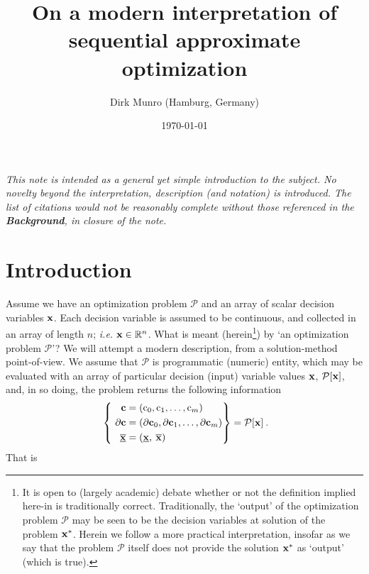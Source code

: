 \documentclass[11pt]{article}
\title{On a modern interpretation of sequential approximate optimization}
\author{Dirk Munro (Hamburg, Germany)}
\date{\today }
\begin{document}
\maketitle
\vspace{-5mm}
\emph{This note is intended as a general yet simple introduction to the subject. No novelty beyond the interpretation, description (and notation) is introduced. The list of citations would not be reasonably complete without those referenced in the \textbf{Background}, in closure of the note.}

\section{Introduction}

Assume we have an optimization problem $\mathcal{P}$ and an array of scalar decision variables $\mathbf{x}$. Each decision variable is assumed to be continuous, and collected in an array of length $n$; \emph{i.e.} $\mathbf{x} \in \mathbb{R}^n$. What is meant (herein\footnote{It is open to (largely academic) debate whether or not the definition implied here-in is traditionally correct. Traditionally, the `output' of the optimization problem $\mathcal{P}$ may be seen to be the decision variables at solution of the problem $\mathbf{x}^\ast$. Herein we follow a more practical interpretation, insofar as we say that the problem $\mathcal{P}$ itself does not provide the solution $\mathbf{x}^\ast$ as `output' (which is true).}) by `an optimization problem $\mathcal{P}$'? We will attempt a modern description, from a solution-method point-of-view. We assume that $\mathcal{P}$ is programmatic (numeric) entity, which may be evaluated with an array of particular decision (input) variable values $\mathbf{x}$, $\mathcal{P}[\mathbf{x}]$, and, in so doing, the problem returns the following information
\begin{align}
\label{d:eqn:p}
 ~\left\{ ~
\begin{aligned}
\mathbf{c} &= (\textrm{c}_0, \textrm{c}_1, \ldots, \textrm{c}_m ) \\
\mathbf{\partial c} & = (\mathbf{\partial c}_0 , \mathbf{\partial c}_1 , \ldots,\mathbf{\partial c}_m  ) \\ \underline{\overline{\mathbf{x}}} & = ( \underline{\mathbf{x}} , \: \overline{\mathbf{x}} ) \:
\end{aligned}\right\} =
\mathcal{P} [\mathbf{x}] \: .
\end{align}
That is 
\end{document}
